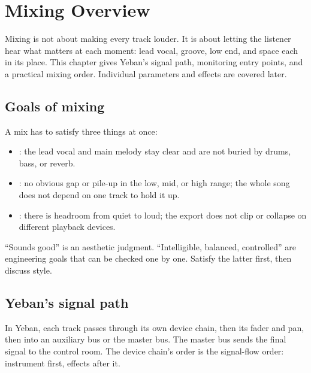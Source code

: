\chapter{Mixing Overview}
\label{chap:mixing-overview}


Mixing is not about making every track louder. It is about letting the listener
hear what matters at each moment: lead vocal, groove, low end, and space each in
its place. This chapter gives Yeban's signal path, monitoring entry points, and a
practical mixing order. Individual parameters and effects are covered later.

\section{Goals of mixing}

A mix has to satisfy three things at once:

\begin{itemize}
  \item {}: the lead vocal and main melody stay clear and are
        not buried by drums, bass, or reverb.
  \item {}: no obvious gap or pile-up in the low, mid, or high range;
        the whole song does not depend on one track to hold it up.
  \item {}: there is headroom from quiet to loud; the export does not
        clip or collapse on different playback devices.
\end{itemize}

``Sounds good'' is an aesthetic judgment. ``Intelligible, balanced, controlled''
are engineering goals that can be checked one by one. Satisfy the latter first,
then discuss style.

\section{Yeban's signal path}

In Yeban, each track passes through its own device chain, then its fader and pan,
then into an auxiliary bus or the master bus. The master bus sends the final signal
to the control room. The device chain's order is the signal-flow order: instrument
first, effects after it.


